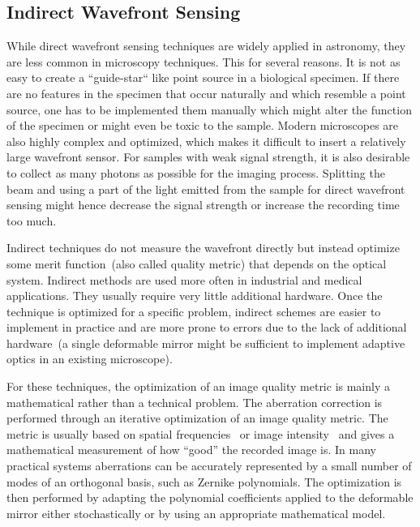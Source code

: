 \subsection{Indirect Wavefront Sensing}
\label{sec:IndirectWavefrontSensing}

While direct wavefront sensing techniques are widely applied in astronomy, they are less common in microscopy techniques. This for several reasons. It is not as easy to create a ``guide-star`` like point source in a biological specimen. If there are no features in the specimen that occur naturally and which resemble a point source, one has to be implemented them manually which might alter the function of the specimen or might even be toxic to the sample. Modern microscopes are also highly complex and optimized, which makes it difficult to insert a relatively large wavefront sensor. For samples with weak signal strength, it is also desirable to collect as many photons as possible for the imaging process. Splitting the beam and using a part of the light emitted from the sample for direct wavefront sensing might hence decrease the signal strength or increase the recording time too much.

Indirect techniques do not measure the wavefront directly but instead optimize some merit function~(also called quality metric) that depends on the optical system. Indirect methods are used more often in industrial and medical applications. They usually require very little additional hardware. Once the technique is optimized for a specific problem, indirect schemes are easier to implement in practice and are more prone to errors due to the lack of additional hardware~(a single deformable mirror might be sufficient to implement adaptive optics in an existing microscope). 

For these techniques, the optimization of an image quality metric is mainly a mathematical rather than a technical problem. The aberration correction is performed through an iterative optimization of an image quality metric. The metric is usually based on spatial frequencies~\cite{wide_AOM_loew_freq} or image intensity~\cite{indirect_metric_intensity} and gives a mathematical measurement of how ``good'' the recorded image is. In many practical systems aberrations can be accurately represented by a small number of modes of an orthogonal basis, such as Zernike polynomials. The optimization is then performed by adapting the polynomial coefficients applied to the deformable mirror either stochastically or by using an appropriate mathematical model.

